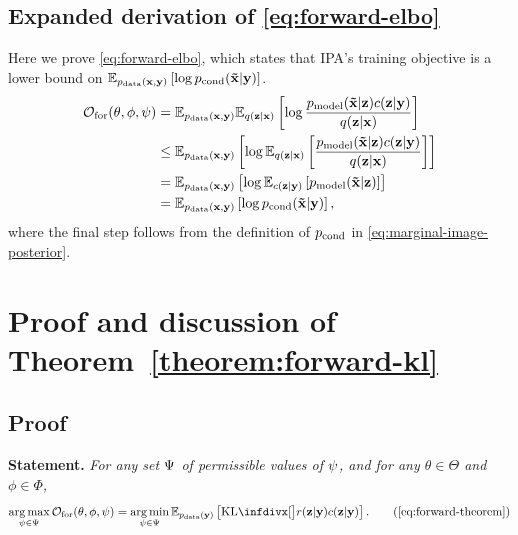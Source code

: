 \subsection{Expanded derivation of \cref{eq:forward-elbo}} \label{supp:cigcvae-forward-elbo-bound-deriv}
Here we prove \cref{eq:forward-elbo}, which states that IPA's training
objective is a lower bound on $\mathbb{E}_{p_{\rm{data}}{}(\mathbf{x}{}, \mathbf{y}{})} \left[ \log
  p_{\text{cond}}{}(\mathbf{\tilde{x}}{}|\mathbf{y}{}) \right]$.
\begin{align}
  \mathcal{O}_\mathrm{for}(\theta, \phi, \psi{}) &= \mathbb{E}_{p_{\rm{data}}{}(\mathbf{x}{}, \mathbf{y}{})} \mathbb{E}_{q(\mathbf{z}{}|\mathbf{x}{})} \left[ \log \frac{p_{\rm{model}}{}(\mathbf{\tilde{x}}{}|\mathbf{z}{})c{}(\mathbf{z}{}|\mathbf{y}{})}{q(\mathbf{z}{}|\mathbf{x}{})} \right] \\
                                                   &\leq \mathbb{E}_{p_{\rm{data}}{}(\mathbf{x}{}, \mathbf{y}{})} \left[ \log \mathbb{E}_{q(\mathbf{z}{}|\mathbf{x}{})} \left[ \frac{p_{\rm{model}}{}(\mathbf{\tilde{x}}{}|\mathbf{z}{})c{}(\mathbf{z}{}|\mathbf{y}{})}{q(\mathbf{z}{}|\mathbf{x}{})} \right]  \right] \\
                                                   &= \mathbb{E}_{p_{\rm{data}}{}(\mathbf{x}{}, \mathbf{y}{})} \left[ \log \mathbb{E}_{c{}(\mathbf{z}{}|\mathbf{y}{})} \left[ p_{\rm{model}}{}(\mathbf{\tilde{x}}{}|\mathbf{z}{}) \right]  \right] \\
                                                   &= \mathbb{E}_{p_{\rm{data}}{}(\mathbf{x}{}, \mathbf{y}{})} \left[ \log p_{\text{cond}}{}(\mathbf{\tilde{x}}{}|\mathbf{y}{}) \right],
\end{align}
where the final step follows from the definition of $p_{\text{cond}}{}$ in
\cref{eq:marginal-image-posterior}.



\section{Proof and discussion of Theorem~\ref{theorem:forward-kl}} \label{proof:forward-kl}
\subsection{Proof}
\textbf{Statement.}
\textit{
  For any set $\Psi$ of
  permissible values of $\psi{}$, and for any $\theta\in\Theta$ and
  $\phi\in\Phi$,
  \begin{equation}
    \argmax_{\partphi{} \in \Partphi} \mathcal{O}_\mathrm{for}(\theta, \phi, \partphi{}) = \argmin_{\partphi{} \in \Partphi} \EX_{\pdata{}(\partI{})} \left[ \kl[\big]{ r(\z{}|\partI{}) }{ \partq{}(\z{}|\partI{}) } \right]. \tag{\ref{eq:forward-theorem}}
  \end{equation}
}

